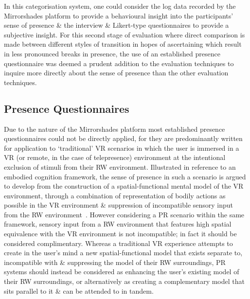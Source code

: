 In this categorisation system, one could consider the log data recorded by the Mirrorshades platform to provide a behavioural insight into the participants' sense of presence \& the interview \& Likert-type questionnaires to provide a subjective insight. For this second stage of evaluation where direct comparison is made between different styles of transition in hopes of ascertaining which result in less pronounced breaks in presence, the use of an established presence questionnaire was deemed a prudent addition to the evaluation techniques to inquire more directly about the sense of presence than the other evaluation techniques.


\subsection{Presence Questionnaires}

Due to the nature of the Mirrorshades platform most established presence questionnaires could not be directly applied,  for they are predominantly written for application to `traditional' VR scenarios in which the user is immersed in a VR (or remote, in the case of telepresence) environment at the intentional exclusion of stimuli from their RW environment. Illustrated in reference to an embodied cognition framework, the sense of presence in such a scenario is argued to develop from the construction of a spatial-functional mental model of the VR environment, through a combination of representation of bodily actions as possible in the VR environment \& suppression of incompatible sensory input from the RW environment~\cite{Schubert2001}. However considering a PR scenario within the same framework, sensory input from a RW environment that features high spatial equivalence with the VR environment is not incompatible; in fact it should be considered complimentary. Whereas a traditional VR experience attempts to create in the user's mind a new spatial-functional model that exists separate to, incompatible with \& suppressing the model of their RW surroundings, PR systems should instead be considered as enhancing the user's existing model of their RW surroundings, or alternatively as creating a complementary model that sits parallel to it \& can be attended to in tandem.

